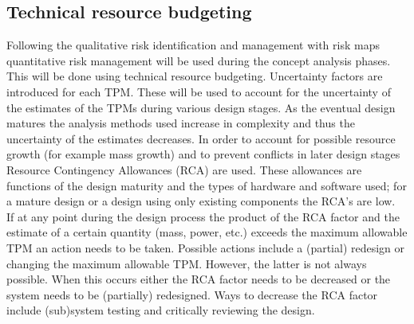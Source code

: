 \subsection{Technical resource budgeting}
Following the qualitative risk identification and management with risk maps quantitative risk management will be used during the concept analysis phases. This will be done using technical resource budgeting. Uncertainty factors are introduced for each TPM. These will be used to account for the uncertainty of the estimates of the TPMs during various design stages. As the eventual design matures the analysis methods used increase in complexity and thus the uncertainty of the estimates decreases. In order to account for possible resource growth (for example mass growth) and to prevent conflicts in later design stages Resource Contingency Allowances (RCA) are used. These allowances are functions of the design maturity and the types of hardware and software used; for a mature design or a design using only existing components the RCA's are low. \\
\noindent If at any point during the design process the product of the RCA factor and the estimate of a certain quantity (mass, power, etc.) exceeds the maximum allowable TPM an action needs to be taken. Possible actions include a (partial) redesign or changing the maximum allowable TPM. However, the latter is not always possible. When this occurs either the RCA factor needs to be decreased or the system needs to be (partially) redesigned. Ways to decrease the RCA factor include (sub)system testing and critically reviewing the design.